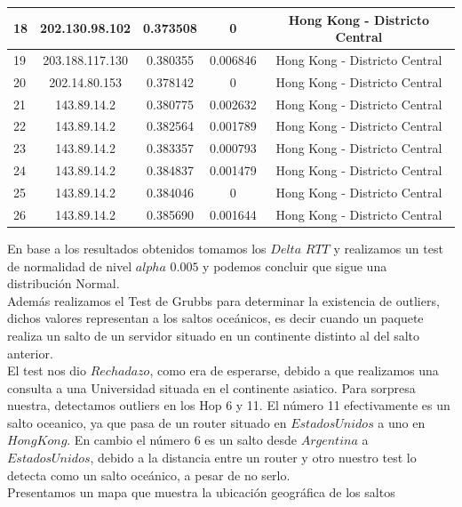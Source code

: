 \begin{tabular}{ | l | c | c | c | c |}
	\hline
		18  &  202.130.98.102  &  0.373508 &  0 & Hong Kong - Districto Central\\
	\hline
		19  &  203.188.117.130 &  0.380355 &  0.006846 & Hong Kong - Districto Central\\
	\hline
		20  &  202.14.80.153  &  0.378142 &  0 & Hong Kong - Districto Central\\
	\hline
		21  &  143.89.14.2  &  0.380775 &  0.002632 & Hong Kong - Districto Central\\
	\hline
		22  &  143.89.14.2  &  0.382564 &  0.001789 & Hong Kong - Districto Central\\
	\hline
		23  &  143.89.14.2  &  0.383357 &  0.000793 & Hong Kong - Districto Central\\
	\hline
		24  &  143.89.14.2  &  0.384837 &  0.001479 & Hong Kong - Districto Central\\
	\hline
		25  &  143.89.14.2  &  0.384046 &  0 & Hong Kong - Districto Central\\
	\hline
		26  &  143.89.14.2  &  0.385690 &  0.001644 & Hong Kong - Districto Central\\
\hline
\end{tabular}

\bigskip

En base a los resultados obtenidos tomamos los $Delta$ $RTT$ y realizamos un test de normalidad de nivel $alpha$ $0.005$ y podemos concluir que sigue una distribución Normal. \\

Además realizamos el Test de Grubbs para determinar la existencia de outliers, dichos valores representan a los saltos oceánicos, es decir cuando un paquete realiza un salto de un servidor situado en un continente distinto al del salto anterior.\\
El test nos dio $Rechadazo$, como era de esperarse, debido a que realizamos una consulta a una Universidad situada en el continente asiatico. Para sorpresa nuestra, detectamos outliers en los Hop 6 y 11. El número 11 efectivamente es un salto oceanico, ya que pasa de un router situado en $Estados Unidos$ a uno en $Hong Kong$. En cambio el número 6 es un salto desde $Argentina$ a $Estados Unidos$, debido a la distancia entre un router y otro nuestro test lo detecta como un salto oceánico, a pesar de no serlo.\\

Presentamos un mapa que muestra la ubicación geográfica de los saltos\\




